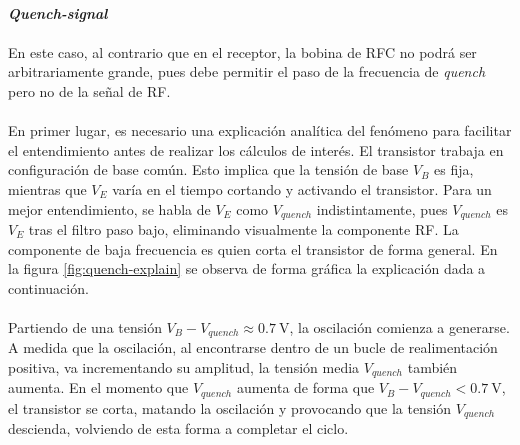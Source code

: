 \paragraph{\textit{Quench-signal}} %
\paragraph{}
En este caso, al contrario que en el receptor, la bobina de RFC no podrá ser arbitrariamente grande, pues debe permitir el paso de la frecuencia de \textit{quench} pero no de la señal de RF.
\paragraph{}
En primer lugar, es necesario una explicación analítica del fenómeno para facilitar el entendimiento antes de realizar los cálculos de interés.
El transistor trabaja en configuración de base común. Esto implica que la tensión de base $V_B$ es fija, mientras que $V_E$ varía en el tiempo cortando y activando el transistor. Para un mejor entendimiento, se habla de $V_E$ como $V_{quench}$ indistintamente, pues $V_{quench}$ es $V_E$ tras el filtro paso bajo, eliminando visualmente la componente RF. La componente de baja frecuencia es quien corta el transistor de forma general. En la figura \ref{fig:quench-explain} se observa de forma gráfica la explicación dada a continuación.
\paragraph{}
Partiendo de una tensión $V_B - V_{quench} \approx \SI{0.7}{\volt}$, la oscilación comienza a generarse.
A medida que la oscilación, al encontrarse dentro de un bucle de realimentación positiva, va incrementando su amplitud, la tensión media $V_{quench}$ también aumenta. En el momento que $V_{quench}$ aumenta de forma que $V_B - V_{quench} < \SI{0.7}{\volt}$, el transistor se corta, matando la oscilación y provocando que la tensión $V_{quench}$ descienda, volviendo de esta forma a completar el ciclo.

